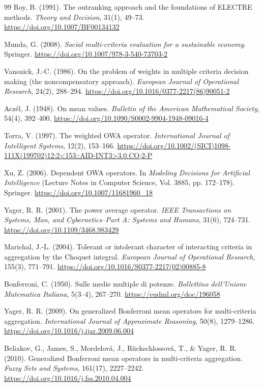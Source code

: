 \documentclass[reqno,11pt]{amsart}
\theoremstyle{definition}
\theoremstyle{plain}
\theoremstyle{remark}
\begin{document}
\begin{thebibliography}{99}
Roy, B. (1991). The outranking approach and the foundations of ELECTRE methods. \emph{Theory and Decision}, 31(1), 49--73. \url{https://doi.org/10.1007/BF00134132}

Munda, G. (2008). \emph{Social multi-criteria evaluation for a sustainable economy}. Springer. \url{https://doi.org/10.1007/978-3-540-73703-2}

Vansnick, J.-C. (1986). On the problem of weights in multiple criteria decision making (the noncompensatory approach). \emph{European Journal of Operational Research}, 24(2), 288--294. \url{https://doi.org/10.1016/0377-2217(86)90051-2}

Acz\'el, J. (1948). On mean values. \emph{Bulletin of the American Mathematical Society}, 54(4), 392--400. \url{https://doi.org/10.1090/S0002-9904-1948-09016-4}

Torra, V. (1997). The weighted OWA operator. \emph{International Journal of Intelligent Systems}, 12(2), 153--166. \url{https://doi.org/10.1002/(SICI)1098-111X(199702)12:2<153::AID-INT3>3.0.CO;2-P}

Xu, Z. (2006). Dependent OWA operators. In \emph{Modeling Decisions for Artificial Intelligence} (Lecture Notes in Computer Science, Vol. 3885, pp. 172--178). Springer. \url{https://doi.org/10.1007/11681960_18}

Yager, R. R. (2001). The power average operator. \emph{IEEE Transactions on Systems, Man, and Cybernetics--Part A: Systems and Humans}, 31(6), 724--731. \url{https://doi.org/10.1109/3468.983429}

Marichal, J.-L. (2004). Tolerant or intolerant character of interacting criteria in aggregation by the Choquet integral. \emph{European Journal of Operational Research}, 155(3), 771--791. \url{https://doi.org/10.1016/S0377-2217(02)00885-8}

Bonferroni, C. (1950). Sulle medie multiple di potenze. \emph{Bollettino dell'Unione Matematica Italiana}, 5(3--4), 267--270. \url{https://eudml.org/doc/196058}

Yager, R. R. (2009). On generalized Bonferroni mean operators for multi-criteria aggregation. \emph{International Journal of Approximate Reasoning}, 50(8), 1279--1286. \url{https://doi.org/10.1016/j.ijar.2009.06.004}

Beliakov, G., James, S., Mordelov\'a, J., R\"uckschlossov\'a, T., \& Yager, R. R. (2010). Generalized Bonferroni mean operators in multi-criteria aggregation. \emph{Fuzzy Sets and Systems}, 161(17), 2227--2242. \url{https://doi.org/10.1016/j.fss.2010.04.004}


\end{thebibliography}
\end{document}

